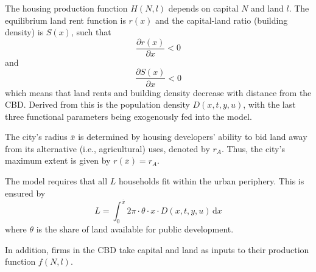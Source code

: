 \documentclass[preprint,2p,12pt]{elsarticle}
\begin{document}
The housing production function $H(N, l)$ depends on capital $N$ and land $l$.
The equilibrium land rent function is $r(x)$ and the capital-land ratio (building density) is $S(x)$, such that 
$$\frac{\partial r(x)}{\partial x} < 0$$ 
and 
$$\frac{\partial S(x)}{\partial x} < 0$$
which means that land rents and building density decrease with distance from the CBD.
Derived from this is the population density $D(x,t,y,u)$, with the last three functional parameters being exogenously fed into the model.

The city's radius $\overline{x}$ is determined by housing developers' ability to bid land away from its alternative (i.e., agricultural) uses, denoted by $r_A$.
Thus, the city's maximum extent is given by $r(\overline{x}) = r_A$.

The model requires that all $L$ households fit within the urban periphery.
This is ensured by 
$$L = \int_{0}^{\overline{x}} \! 2 \pi \cdot \theta \cdot x \cdot D(x,t,y,u) \, \mathrm{d}x$$
where $\theta$ is the share of land available for public development.

In addition, firms in the CBD take capital and land as inputs to their production function $f(N,l)$.
\end{document}
